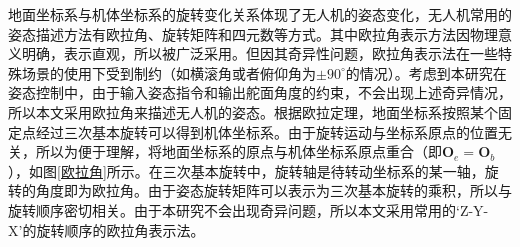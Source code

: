 地面坐标系与机体坐标系的旋转变化关系体现了无人机的姿态变化，无人机常用的姿态描述方法有欧拉角、旋转矩阵和四元数等方式。其中欧拉角表示方法因物理意义明确，表示直观，所以被广泛采用。但因其奇异性问题\cite{全权2018多旋翼飞行器设计与控制}，欧拉角表示法在一些特殊场景的使用下受到制约（如横滚角或者俯仰角为$\pm90^{\circ}$的情况）。考虑到本研究在姿态控制中，由于输入姿态指令和输出舵面角度的约束，不会出现上述奇异情况，所以本文采用欧拉角来描述无人机的姿态。根据欧拉定理，地面坐标系按照某个固定点经过三次基本旋转可以得到机体坐标系。由于旋转运动与坐标系原点的位置无关，所以为便于理解，将地面坐标系的原点与机体坐标系原点重合（即$\boldsymbol{O}_e=\boldsymbol{O}_b$），如图\ref{欧拉角}所示。在三次基本旋转中，旋转轴是待转动坐标系的某一轴，旋转的角度即为欧拉角。由于姿态旋转矩阵可以表示为三次基本旋转的乘积，所以与旋转顺序密切相关。由于本研究不会出现奇异问题，所以本文采用常用的‘Z-Y-X’的旋转顺序的欧拉角表示法。


